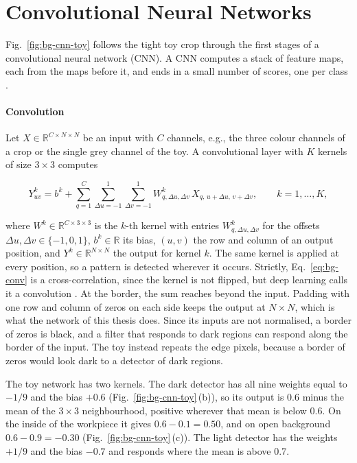 \section{Convolutional Neural Networks}
\label{sec:background-cnn}

Fig.~\ref{fig:bg-cnn-toy} follows the tight toy crop through the first stages of a
convolutional neural network (CNN). A CNN computes a stack of feature maps, each from
the maps before it, and ends in a small number of scores, one per
class \citep[Ch.~9]{goodfellow2016deep}.

\paragraph{Convolution}
Let $X \in \mathbb{R}^{C \times N \times N}$ be an input with $C$ channels, e.g., the
three colour channels of a crop or the single grey channel of the toy. A convolutional
layer with $K$ kernels of size $3 \times 3$ computes

\begin{equation}
Y^k_{uv} = b^k + \sum_{q=1}^{C} \sum_{\Delta u=-1}^{1} \sum_{\Delta v=-1}^{1}
W^k_{q,\Delta u,\Delta v}\, X_{q,\,u+\Delta u,\,v+\Delta v}, \qquad k = 1, \dots, K,
\label{eq:bg-conv}
\end{equation}

where $W^k \in \mathbb{R}^{C \times 3 \times 3}$ is the $k$-th kernel with entries
$W^k_{q,\Delta u,\Delta v}$ for the offsets $\Delta u, \Delta v \in \{-1, 0, 1\}$,
$b^k \in \mathbb{R}$ its bias, $(u, v)$ the row and column of an output position, and
$Y^k \in \mathbb{R}^{N \times N}$ the output for kernel $k$. The same kernel is applied at
every position, so a pattern is detected wherever it occurs. Strictly,
Eq.~\eqref{eq:bg-conv} is a cross-correlation, since the kernel is not flipped, but
deep learning calls it a convolution \citep[Sec.~9.1]{goodfellow2016deep}. At the border, the sum
reaches beyond the input. Padding with one row and column of zeros on each side keeps
the output at $N \times N$, which is what the network of this thesis does. Since its
inputs are not normalised, a border of zeros is black, and a filter that responds to dark
regions can respond along the border of the input. The toy
instead repeats the edge pixels, because a border of zeros would look dark to a
detector of dark regions.

The toy network has two kernels. The dark detector has all nine weights equal to $-1/9$
and the bias $+0.6$ (Fig.~\ref{fig:bg-cnn-toy}\,(b)), so its output is 0.6 minus the
mean of the $3 \times 3$ neighbourhood, positive wherever that mean is below 0.6. On the
inside of the workpiece it gives $0.6 - 0.1 = 0.50$, and on open background
$0.6 - 0.9 = -0.30$ (Fig.~\ref{fig:bg-cnn-toy}\,(c)). The light detector has the
weights $+1/9$ and the bias $-0.7$ and responds where the mean is above 0.7.

